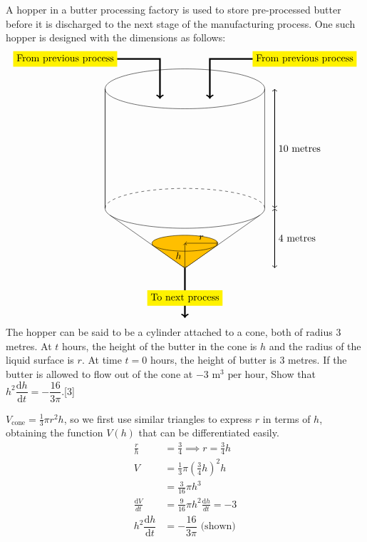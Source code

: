 \documentclass[12pt, a4 paper]{article}
\begin{document}
\begin{outline}[enumerate]
 \1 A hopper in a butter processing factory is used to store pre-processed butter before it is discharged to the next stage of the manufacturing process. One such hopper is designed with the dimensions as follows: %
 \[
  \begin{tikzpicture}
   \draw (0,0) ellipse (80pt and 20pt); %
   \draw (-80pt,0) -- (-80pt,-120pt);
   \draw (80pt,0) -- (80pt,-120pt);
   \draw (-80pt,0) -- (-80pt,-120pt);
   \draw[dashed] (-80pt,-120pt) arc (180:0:80pt and 20pt);
   \draw (-80pt,-120pt) arc (180:360:80pt and 20pt);
   \draw[<->,thick] (90pt,0) -- (90pt,-60pt) node[right] {10 metres} -- (90pt,-120pt);%
   \draw (-75pt,-127pt) -- (0, -180pt); %
   \draw (0,-180pt) -- (75pt,-127pt);
   \draw[<->,thick] (90pt,-120pt) -- (90pt,-150pt) node[right] {4 metres} -- (90pt,-180pt);%
   \draw[->,ultra thick] (-120pt,30pt) node [fill=yellow]{From previous process}-- (-25pt,30pt) -- (-25pt,-10pt); %
   \draw[->,ultra thick] (120pt,30pt) node [fill=yellow]{From previous process}-- (25pt,30pt) -- (25pt,-10pt);
   \draw[->,ultra thick] (0,-180pt) -- (0,-210pt) node[fill=yellow]{To next process} -- (0,-230pt); %
   \filldraw [orange!50!yellow,draw=black](0,-180pt) -- (33pt,-156.68pt) -- (-33pt,-156.68pt) -- cycle; %
   \filldraw [orange!50!yellow,draw=black](0,-155pt) ellipse (33pt and 8pt);
   \draw[<->] (0,-155pt) -- (16.5pt, -155pt) node [above]{$r$}-- (33pt,-155pt);
   \draw[<->] (0,-155pt) -- (0, -167.5pt) node [left]{$h$}-- (0,-180pt); %
  \end{tikzpicture}
 \]
 The hopper can be said to be a cylinder attached to a cone, both of radius 3 metres. At $t$ hours, the height of the butter in the cone is $h$ and the radius of the liquid surface is $r$. At time $t = 0$ hours, the height of butter is 3 metres.\newline
 If the butter is allowed to flow out of the cone at $- 3\textrm{ m}^3{\textrm{ per hour}}$,
 \2 Show that ${h^2}\dfrac{{{\mathrm{d}}h}}{{{\mathrm{d}}t}} =  - \dfrac{{16}}{{3\pi }}$.\hfill[3]
 \begin{answer}
  $V_{\textrm{cone}}=\frac{1}{3}\pi r^2 h$, so we first use similar triangles to express $r$ in terms of $h$, obtaining the function $V(h)$ that can be differentiated easily.
  \begin{align*}
   \frac{r}{h}                                   & =\frac{3}{4} \implies r=\frac{3}{4}h               \\
   V                                             & = \frac{1}{3}\pi \left(\frac{3}{4}h\right)^2 h     \\
                                                 & = \frac{3}{16}\pi h^3                              \\
   \frac{\mathrm{d}V}{{d}t}                      & = \frac{9}{16}\pi h^2\frac{\mathrm{d}h}{{d}t} = -3 \\
   {h^2}\dfrac{{{\mathrm{d}}h}}{{{\mathrm{d}}t}} & =  - \dfrac{{16}}{{3\pi }} \textrm{ (shown)}
  \end{align*}
 \end{answer}


\end{outline}
\end{document}
